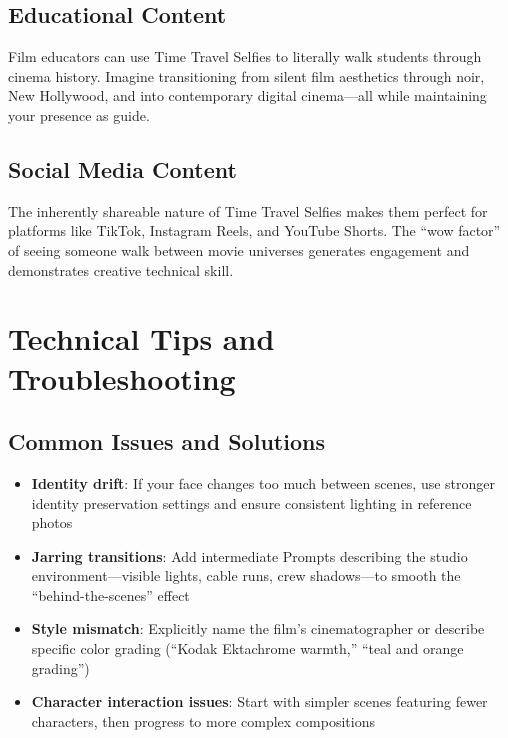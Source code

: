 \subsection{Educational Content}

Film educators can use Time Travel Selfies to literally walk students through cinema history. Imagine transitioning from silent film aesthetics through noir, New Hollywood, and into contemporary digital cinema—all while maintaining your presence as guide.

\subsection{Social Media Content}

The inherently shareable nature of Time Travel Selfies makes them perfect for platforms like TikTok, Instagram Reels, and YouTube Shorts. The ``wow factor'' of seeing someone walk between movie universes generates engagement and demonstrates creative technical skill.

\section{Technical Tips and Troubleshooting}
\label{sec:tips-troubleshooting}

\subsection{Common Issues and Solutions}

\begin{itemize}
\item \textbf{Identity drift}: If your face changes too much between scenes, use stronger identity preservation settings and ensure consistent lighting in reference photos

\item \textbf{Jarring transitions}: Add intermediate Prompts describing the studio environment—visible lights, cable runs, crew shadows—to smooth the ``behind-the-scenes'' effect

\item \textbf{Style mismatch}: Explicitly name the film's cinematographer or describe specific color grading (``Kodak Ektachrome warmth,'' ``teal and orange grading'')

\item \textbf{Character interaction issues}: Start with simpler scenes featuring fewer characters, then progress to more complex compositions
\end{itemize}

